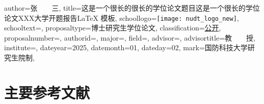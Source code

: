 \documentclass{NUDTproposal}
\begin{document}
\NUDTvalueset
{
    author={张~~~~三},                %
    title={这是一个很长的很长的学位论文题目这是一个很长的学位论文XXX大学开题报告\LaTeX{} 模板},                          %
    schoollogo={\texttt{[image: nudt\_logo\_new]}},
    schooltext={},
    proposaltype={博士研究生学位论文}, %
    classification={\underline{\qquad 公开\qquad}},          %
    proposalnumber={\underline{\makebox[3cm][c]{~~}}},  %
    authorid={},            %
    major={},         %
    field={},               %
    advisor={},               %
    advisortitle={教~~~~授},        %
    institute={}, %
    dateyear={2025},      %
    datemonth={01},      %
    dateday={02},      %
    mark={国防科技大学研究生院制},  %
}

\makecover



%
\clearpage

%
\clearpage

%
\clearpage

%
\clearpage

%
\clearpage


\section{主要参考文献}
\printbibtabular[heading=none]

\clearpage


%
\clearpage


\clearpage
\end{document}
